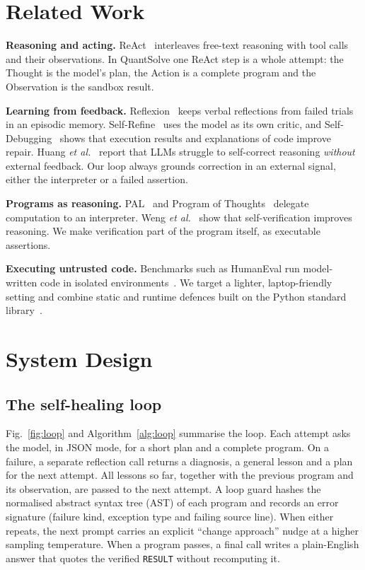 \documentclass[conference]{IEEEtran}
\begin{document}
\section{Related Work}
\textbf{Reasoning and acting.} ReAct~\cite{yao2023react} interleaves free-text reasoning with tool calls and their observations. In QuantSolve one ReAct step is a whole attempt: the Thought is the model's plan, the Action is a complete program and the Observation is the sandbox result.

\textbf{Learning from feedback.} Reflexion~\cite{shinn2023reflexion} keeps verbal reflections from failed trials in an episodic memory. Self-Refine~\cite{madaan2023selfrefine} uses the model as its own critic, and Self-Debugging~\cite{chen2024selfdebug} shows that execution results and explanations of code improve repair. Huang \emph{et al.}~\cite{huang2024cannot} report that LLMs struggle to self-correct reasoning \emph{without} external feedback. Our loop always grounds correction in an external signal, either the interpreter or a failed assertion.

\textbf{Programs as reasoning.} PAL~\cite{gao2023pal} and Program of Thoughts~\cite{chen2023pot} delegate computation to an interpreter. Weng \emph{et al.}~\cite{weng2023selfverify} show that self-verification improves reasoning. We make verification part of the program itself, as executable assertions.

\textbf{Executing untrusted code.} Benchmarks such as HumanEval run model-written code in isolated environments~\cite{chen2021codex}. We target a lighter, laptop-friendly setting and combine static and runtime defences built on the Python standard library~\cite{pythondocs}.

\section{System Design}
\subsection{The self-healing loop}
Fig.~\ref{fig:loop} and Algorithm~\ref{alg:loop} summarise the loop. Each attempt asks the model, in JSON mode, for a short plan and a complete program. On a failure, a separate reflection call returns a diagnosis, a general lesson and a plan for the next attempt. All lessons so far, together with the previous program and its observation, are passed to the next attempt. A loop guard hashes the normalised abstract syntax tree (AST) of each program and records an error signature (failure kind, exception type and failing source line). When either repeats, the next prompt carries an explicit ``change approach'' nudge at a higher sampling temperature. When a program passes, a final call writes a plain-English answer that quotes the verified \texttt{RESULT} without recomputing it.
\end{document}
